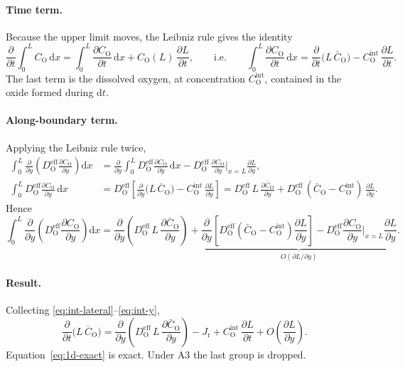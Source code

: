 \documentclass[12pt]{article}
\newcommand{\eff}{\mathrm{eff}}
\newcommand{\intf}{\mathrm{int}}
\newcommand{\Ox}{\mathrm{O}}
\newcommand{\D}{D_{\Ox}^{\eff}}
\newcommand{\Cb}{\bar{C}_{\Ox}}
\newcommand{\Ci}{C_{\Ox}^{\intf}}
\newcommand{\Jr}{J_{\mathrm{r}}}
\newcommand{\dd}{\mathrm{d}}
\begin{document}
\paragraph{Time term.} Because the upper limit moves, the Leibniz rule gives the
identity
\begin{equation}
\frac{\partial}{\partial t}\int_{0}^{L}C_{\Ox}\,\dd x
 =\int_{0}^{L}\frac{\partial C_{\Ox}}{\partial t}\,\dd x
  +C_{\Ox}(L)\,\frac{\partial L}{\partial t},
\qquad\text{i.e.}\qquad
\int_{0}^{L}\frac{\partial C_{\Ox}}{\partial t}\,\dd x
 =\frac{\partial}{\partial t}\bigl(L\,\Cb\bigr)-\Ci\,\frac{\partial L}{\partial t}.
\label{eq:int-time}
\end{equation}
The last term is the dissolved oxygen, at concentration $\Ci$, contained in the
oxide formed during $\dd t$.

\paragraph{Along-boundary term.} Applying the Leibniz rule twice,
\begin{align}
\int_{0}^{L}\frac{\partial}{\partial y}\!\left(\D\frac{\partial C_{\Ox}}{\partial y}\right)\dd x
 &=\frac{\partial}{\partial y}\int_{0}^{L}\D\frac{\partial C_{\Ox}}{\partial y}\,\dd x
   -\D\,\frac{\partial C_{\Ox}}{\partial y}\bigg|_{x=L}\frac{\partial L}{\partial y},
\\
\int_{0}^{L}\D\frac{\partial C_{\Ox}}{\partial y}\,\dd x
 &=\D\left[\frac{\partial}{\partial y}\bigl(L\,\Cb\bigr)-\Ci\,\frac{\partial L}{\partial y}\right]
  =\D\,L\,\frac{\partial\Cb}{\partial y}
   +\D\,(\Cb-\Ci)\,\frac{\partial L}{\partial y}.
\end{align}
Hence
\begin{equation}
\int_{0}^{L}\frac{\partial}{\partial y}\!\left(\D\frac{\partial C_{\Ox}}{\partial y}\right)\dd x
 =\frac{\partial}{\partial y}\!\left(\D\,L\,\frac{\partial\Cb}{\partial y}\right)
  +\underbrace{\frac{\partial}{\partial y}\!\left[\D(\Cb-\Ci)\frac{\partial L}{\partial y}\right]
   -\D\frac{\partial C_{\Ox}}{\partial y}\bigg|_{x=L}\frac{\partial L}{\partial y}}_{O(\partial L/\partial y)} .
\label{eq:int-y}
\end{equation}

\paragraph{Result.} Collecting \eqref{eq:int-lateral}--\eqref{eq:int-y},
\begin{equation}
\frac{\partial}{\partial t}\bigl(L\,\Cb\bigr)
 =\frac{\partial}{\partial y}\!\left(\D\,L\,\frac{\partial\Cb}{\partial y}\right)
  -\Jr
  +\Ci\,\frac{\partial L}{\partial t}
  +O\!\left(\frac{\partial L}{\partial y}\right).
\label{eq:1d-exact}
\end{equation}
Equation~\eqref{eq:1d-exact} is exact. Under A3 the last group is dropped.
\end{document}
